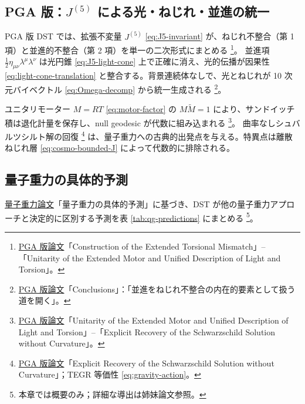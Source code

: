 \documentclass[dvipdfmx,a4paper,oneside]{jsbook}
\numberwithin{equation}{chapter}
\begin{document}
\subsection{PGA 版：\(J^{(5)}\) による光・ねじれ・並進の統一}

PGA 版 DST では、拡張不変量 \(J^{(5)}\) \eqref{eq:J5-invariant} が、ねじれ不整合（第 1 項）と並進的不整合（第 2 項）を単一の二次形式にまとめる \footnote{\hyperref[sec:sister-manuscripts]{PGA 版論文}「Construction of the Extended Torsional Mismatch」–「Unitarity of the Extended Motor and Unified Description of Light and Torsion」。}。
並進項 \(\tfrac{1}{2}\eta_{\mu\nu}\lambda^\mu\lambda^\nu\) は光円錐 \eqref{eq:J5-light-cone} 上で正確に消え、光的伝播が因果性 \eqref{eq:light-cone-translation} と整合する。背景連続体なしで、光とねじれが 10 次元バイベクトル \eqref{eq:Omega-decomp} から統一生成される \footnote{\hyperref[sec:sister-manuscripts]{PGA 版論文}「Conclusions」：「並進をねじれ不整合の内在的要素として扱う道を開く」。}。

ユニタリモーター \(M = RT\) \eqref{eq:motor-factor} の \(M\widetilde{M} = 1\) により、サンドイッチ積は退化計量を保存し、null geodesic が代数に組み込まれる \footnote{\hyperref[sec:sister-manuscripts]{PGA 版論文}「Unitarity of the Extended Motor and Unified Description of Light and Torsion」–「Explicit Recovery of the Schwarzschild Solution without Curvature」。}。
曲率なしシュバルツシルト解の回復 \footnote{\hyperref[sec:sister-manuscripts]{PGA 版論文}「Explicit Recovery of the Schwarzschild Solution without Curvature」；TEGR 等価性 \eqref{eq:gravity-action}。} は、量子重力への古典的出発点を与える。特異点は離散ねじれ層 \eqref{eq:cosmo-bounded-J} によって代数的に排除される。

\subsection{量子重力の具体的予測}

\hyperref[sec:sister-manuscripts]{量子重力論文}「量子重力の具体的予測」に基づき、DST が他の量子重力アプローチと決定的に区別する予測を表 \ref{tab:qg-predictions} にまとめる \footnote{本章では概要のみ；詳細な導出は姉妹論文参照。}。
\end{document}
